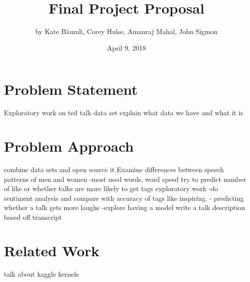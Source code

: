 \documentclass{article}
\title{Final Project Proposal}
\author{by Kate B{\"a}umli, Corey Hulse, Amanraj Mahal, John Sigmon}
\date{April 9, 2018}
\begin{document}
\maketitle

\section{Problem Statement}
Exploratory work on ted talk data set
explain what data we have and what it is

\section{Problem Approach}
combine data sets and open source it
Examine differences between speech patterns of men and women
-most used words, word speed
try to predict number of like or whether talks are more likely to get tags
exploratory work
-do sentiment analysis and compare with accuracy of tags
 like inspiring.
- predicting whether a talk gets more laughs
-explore having a model write a talk description based off transcript

\section{Related Work}
talk about kaggle kernels
\end{document}
